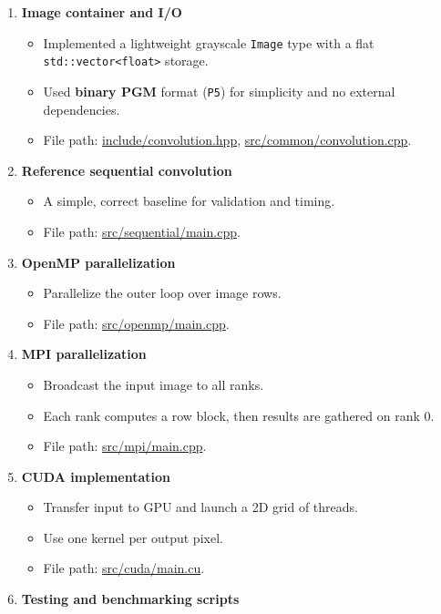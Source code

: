 \documentclass[
]{article}
\providecommand{\tightlist}{%
  \setlength{\itemsep}{0pt}\setlength{\parskip}{0pt}}
\begin{document}
\begin{enumerate}
\def\labelenumi{\arabic{enumi}.}
\tightlist
\item
  \textbf{Image container and I/O}

  \begin{itemize}
  \tightlist
  \item
    Implemented a lightweight grayscale \texttt{Image} type with a flat
    \texttt{std::vector\textless{}float\textgreater{}} storage.
  \item
    Used \textbf{binary PGM} format (\texttt{P5}) for simplicity and no
    external dependencies.
  \item
    File path: \url{include/convolution.hpp},
    \url{src/common/convolution.cpp}.
  \end{itemize}
\item
  \textbf{Reference sequential convolution}

  \begin{itemize}
  \tightlist
  \item
    A simple, correct baseline for validation and timing.
  \item
    File path: \url{src/sequential/main.cpp}.
  \end{itemize}
\item
  \textbf{OpenMP parallelization}

  \begin{itemize}
  \tightlist
  \item
    Parallelize the outer loop over image rows.
  \item
    File path: \url{src/openmp/main.cpp}.
  \end{itemize}
\item
  \textbf{MPI parallelization}

  \begin{itemize}
  \tightlist
  \item
    Broadcast the input image to all ranks.
  \item
    Each rank computes a row block, then results are gathered on rank 0.
  \item
    File path: \url{src/mpi/main.cpp}.
  \end{itemize}
\item
  \textbf{CUDA implementation}

  \begin{itemize}
  \tightlist
  \item
    Transfer input to GPU and launch a 2D grid of threads.
  \item
    Use one kernel per output pixel.
  \item
    File path: \url{src/cuda/main.cu}.
  \end{itemize}
\item
  \textbf{Testing and benchmarking scripts}


\end{enumerate}
\end{document}
